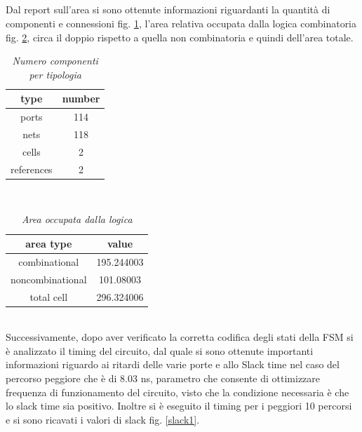 \\
\\
\\
\\
Dal report sull'area si sono ottenute informazioni riguardanti la quantità di componenti e connessioni fig. \ref{numcomp}, l’area relativa occupata dalla logica combinatoria fig. \ref{areatype}, circa il doppio rispetto a quella non combinatoria e quindi dell’area totale.
\begin{table}[!h]\footnotesize
	\centering
	\begin{tabular}{|c|c|}
		\hline
		\textbf{type} & \textbf{number}\\
		\hline
		ports & 114\\
		\hline
		nets & 118\\
		\hline
		cells & 2\\
		\hline
		references & 2\\
		\hline
	\end{tabular}
	\caption{\textit{Numero componenti per tipologia}}
\label{numcomp}
\end{table} \\
\begin{table}[!h]\footnotesize
	\centering
	\begin{tabular}{|c|c|}
		\hline
		\textbf{area type} & \textbf{value}\\
		\hline
		combinational & 195.244003\\
		\hline
		noncombinational & 101.08003\\
		\hline
		total cell & 296.324006\\
		\hline
	\end{tabular}
	\caption{\textit{Area occupata dalla logica}}
\label{areatype}
\end{table} \\
Successivamente, dopo aver verificato la corretta codifica degli stati della FSM  si è analizzato il timing del circuito, dal quale si sono ottenute importanti informazioni riguardo ai ritardi delle varie porte e allo Slack time nel caso del percorso peggiore che è di 8.03 ns, parametro che consente di ottimizzare frequenza di funzionamento del circuito, visto che la condizione necessaria è che lo slack time sia positivo. Inoltre si è eseguito il timing per  i peggiori 10 percorsi e si sono ricavati i valori di slack fig. \ref{slack1}.
